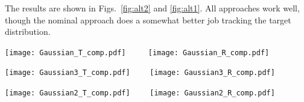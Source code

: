 \documentclass[aps,prx,reprint,preprintnumbers,superscriptaddress,nofootinbib,longbibliography,floatfix]{revtex4-2}
\DeclareRobustCommand{\Fig}[1]{Fig.~\ref{fig:#1}}
\DeclareRobustCommand{\Figs}[2]{Figs.~\ref{fig:#1} and \ref{fig:#2}}
\begin{document}
The results are shown in \Figs{alt2}{alt1}.
%
All approaches work well, though the nominal approach does a somewhat better job tracking the target distribution.

\begin{figure*}[p]
    \centering
    \texttt{[image: Gaussian\_T\_comp.pdf]} $\qquad$
     \texttt{[image: Gaussian\_R\_comp.pdf]}
     
     \texttt{[image: Gaussian3\_T\_comp.pdf]}$\qquad$
     \texttt{[image: Gaussian3\_R\_comp.pdf]}
     
         \texttt{[image: Gaussian2\_T\_comp.pdf]}$\qquad$
     \texttt{[image: Gaussian2\_R\_comp.pdf]}
     
    \caption{Alternative neural conditional reweighting methods for the plain Gaussian example in \Fig{gaussian} (top row), for the extrapolation Gaussian example in \Fig{gaussianEx} (middle row), and for the interpolation Gaussian example in \Fig{gaussianIn} (bottom row).}
    \label{fig:alt1}
\end{figure*}


\end{document}
